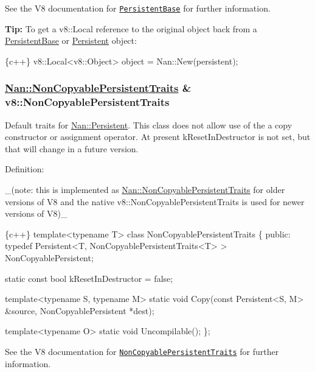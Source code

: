 See the V8 documentation for \href{https://v8docs.nodesource.com/io.js-3.0/d4/dca/classv8_1_1_persistent_base.html}{\tt {\ttfamily Persistent\+Base}} for further information.

{\bfseries Tip\+:} To get a {\ttfamily v8\+::\+Local} reference to the original object back from a {\ttfamily \hyperlink{class_persistent_base}{Persistent\+Base}} or {\ttfamily \hyperlink{class_persistent}{Persistent}} object\+:


\begin{DoxyCode}
\{c++\}
v8::Local<v8::Object> object = Nan::New(persistent);
\end{DoxyCode}


\label{_api_nan_non_copyable_persistent_traits}%
 \subsubsection*{\hyperlink{class_nan_1_1_non_copyable_persistent_traits}{Nan\+::\+Non\+Copyable\+Persistent\+Traits} \& v8\+::\+Non\+Copyable\+Persistent\+Traits}

Default traits for {\ttfamily \hyperlink{class_nan_1_1_persistent}{Nan\+::\+Persistent}}. This class does not allow use of the a copy constructor or assignment operator. At present {\ttfamily k\+Reset\+In\+Destructor} is not set, but that will change in a future version.

Definition\+:

\+\_\+(note\+: this is implemented as {\ttfamily \hyperlink{class_nan_1_1_non_copyable_persistent_traits}{Nan\+::\+Non\+Copyable\+Persistent\+Traits}} for older versions of V8 and the native {\ttfamily v8\+::\+Non\+Copyable\+Persistent\+Traits} is used for newer versions of V8)\+\_\+


\begin{DoxyCode}
\{c++\}
template<typename T> class NonCopyablePersistentTraits \{
 public:
  typedef Persistent<T, NonCopyablePersistentTraits<T> > NonCopyablePersistent;

  static const bool kResetInDestructor = false;

  template<typename S, typename M>
  static void Copy(const Persistent<S, M> &source,
                   NonCopyablePersistent *dest);

  template<typename O> static void Uncompilable();
\};
\end{DoxyCode}


See the V8 documentation for \href{https://v8docs.nodesource.com/io.js-3.0/de/d73/classv8_1_1_non_copyable_persistent_traits.html}{\tt {\ttfamily Non\+Copyable\+Persistent\+Traits}} for further information.

